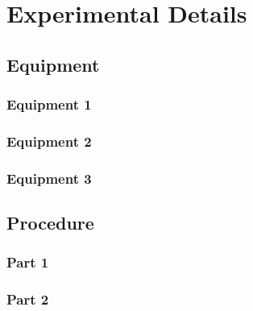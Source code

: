 \section{Experimental Details}

	\subsection{Equipment}
		
		\subsubsection{Equipment 1}
		
		\subsubsection{Equipment 2}
		
		\subsubsection{Equipment 3}
	
	\subsection{Procedure}
	
		\subsubsection{Part 1}
		
		\subsubsection{Part 2}
